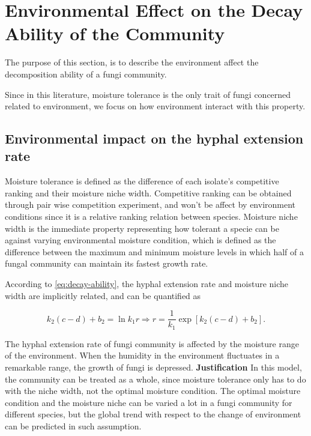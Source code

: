 \section{Environmental Effect on the Decay Ability of the Community}\label{sec:env}

The purpose of this section, is to describe the environment affect the decomposition ability of a fungi community.

Since in this literature, moisture tolerance is the only trait of fungi concerned related to environment, we focus on how environment interact with this property.

\subsection{Environmental impact on the hyphal extension rate}

Moisture tolerance is defined as the difference of each isolate’s competitive ranking and their moisture niche width. Competitive ranking can be obtained through pair wise competition experiment, and won't be affect by environment conditions since it is a relative ranking relation between species. Moisture niche width is the immediate property representing how tolerant a specie can be against varying environmental moisture condition, which is defined as the difference between the maximum and minimum moisture levels in which half of a fungal community can maintain its fastest growth rate.

According to \eqref{eq:decay-ability}, the hyphal extension rate and moisture niche width are implicitly related, and can be quantified as

\begin{equation}
    k_2(c - d) + b_2 = \ln k_1r \Rightarrow
    r = \frac{1}{k_1} \exp[k_2(c -d) +b_2].
\end{equation}

\begin{definition}
    The hyphal extension rate of fungi community is affected by the moisture range of the environment. When the humidity in the environment fluctuates in a remarkable range, the growth of fungi is depressed. 
    \textbf{Justification} In this model, the community can be treated as a whole, since moisture tolerance only has to do with the niche width, not the optimal moisture condition. The optimal moisture condition and the moisture niche can be varied a lot in a fungi community for different species, but the global trend with respect to the change of environment can be predicted in such assumption.
\end{definition}


